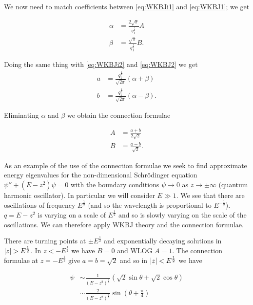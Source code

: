 \documentclass{notes}
\theoremstyle{plain}
\begin{document}
We now need to match coefficients between \eqref{eq:WKBJi1} and
\eqref{eq:WKBJ1}; we get

\begin{align*}
\alpha &= \frac{2 \sqrt{\pi}}{q_1^{\frac{1}{6}}} A \\
\beta &= \frac{\sqrt{\pi}}{q_1^{\frac{1}{6}}} B.
\end{align*}

Doing the same thing with \eqref{eq:WKBJi2} and \eqref{eq:WKBJ2} we get
\begin{align*}
a &= \frac{q_1^{\frac{1}{6}}}{\sqrt{2 \pi}} \left( \alpha + \beta \right) \\
b &= \frac{q_1^{\frac{1}{6}}}{\sqrt{2 \pi}} \left( \alpha - \beta \right).
\end{align*}

Eliminating $\alpha$ and $\beta$ we obtain the connection formulae

\begin{equation}\label{eq:connect}
\begin{split}
A &= \frac{a + b}{2 \sqrt{2}} \\
B &= \frac{a - b}{\sqrt{2}}.
\end{split}
\end{equation}

As an example of the use of the connection formulae we seek to find
approximate energy eigenvalues for the non-dimensional Schr\"odinger equation
$\psi'' + \left( E - z^2 \right) \psi = 0$ with the boundary conditions
$\psi \to 0$ as $z \to \pm \infty$ (quantum harmonic oscillator).
In particular we will consider $E \gg 1$.  We see that there are oscillations
of frequency $E^{\frac{1}{2}}$ (and so the wavelength is
proportional to $E^{-\frac{1}{2}}$).  $q = E - z^2$ is varying on a scale
of $E^{\frac{1}{2}}$ and so is slowly varying on the scale of the oscillations.
We can therefore apply WKBJ theory and the connection formulae.

There are turning points at $\pm E^{\frac{1}{2}}$ and exponentially
decaying solutions in $\left|z\right| > E^{\frac{1}{2}}$.  In $z < - E^{\frac{1}{2}}$
we have $B = 0$ and WLOG $A=1$.  The connection formulae at $z =
- E^{\frac{1}{2}}$ give $a = b = \sqrt{2}$ and so in $\left|z\right| <
E^{\frac{1}{2}}$ we have

\begin{align*}
\psi &\sim \frac{1}{\left( E - z^2 \right)^{\frac{1}{4}}}
\left( \sqrt{2} \sin \theta + \sqrt{2} \cos \theta \right) \\
& \sim \frac{2}{\left( E - z^2 \right)^{\frac{1}{4}}} \sin \left( \theta
+ \frac{\pi}{4} \right)
\end{align*}
\end{document}
